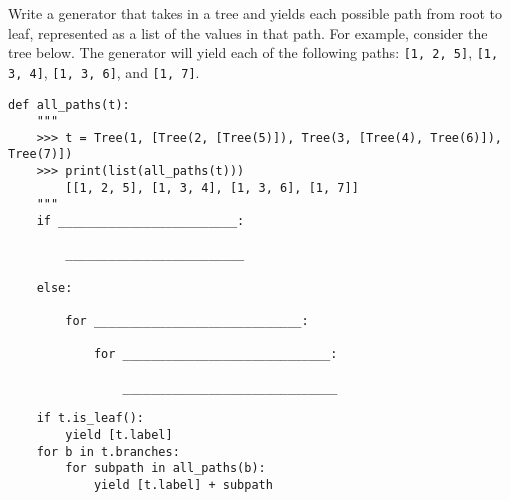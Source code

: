 \begin{blocksection}
\question Write a generator that takes in a tree and yields each possible path from root to leaf, represented as a list of the values in that path.
\newline
For example, consider the tree below. The generator will yield each of the following paths: \lstinline{[1, 2, 5]}, \lstinline{[1, 3, 4]}, \lstinline{[1, 3, 6]}, and \lstinline{[1, 7]}.
\newline
{}
\newline
\begin{lstlisting}
def all_paths(t):
    """
    >>> t = Tree(1, [Tree(2, [Tree(5)]), Tree(3, [Tree(4), Tree(6)]), Tree(7)])
    >>> print(list(all_paths(t)))
        [[1, 2, 5], [1, 3, 4], [1, 3, 6], [1, 7]]
    """    
    if _________________________:

        _________________________

    else:

        for _____________________________:

            for _____________________________:

                ______________________________
\end{lstlisting}
\end{blocksection}
\begin{blocksection}
\begin{solution}[0in]
\begin{lstlisting}
    if t.is_leaf():
        yield [t.label]
    for b in t.branches:
        for subpath in all_paths(b):
            yield [t.label] + subpath
\end{lstlisting}

\end{solution}
\end{blocksection}
